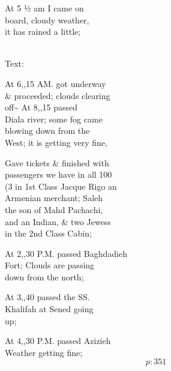 \documentclass{report}
\begin{document}

	\par{
 	At 5 ½ am I came on\ \\board, cloudy weather,\ \\it has rained a little;\ \\\ \\
	}

	\par{
 	Text:\ \\
	}

	\par{
 	At 6,,15 AM. got underway\ \\\& proceeded; clouds clearing\ \\off\~{} At 8,,15 passed\ \\Diala river; some fog came\ \\blowing down from the\ \\West; it is getting very fine,\ \\
	}

	\par{
 	Gave tickets \& finished with\ \\passengers we have in all 100\ \\(3 in 1st Class Jacque Rigo an\ \\Armenian merchant; Saleh\ \\the son of Mahd Pachachi,\ \\and an Indian, \& two Jewess\ \\in the 2nd Class Cabin;\ \\
	}

	\par{
 	At 2,,30 P.M. passed Baghdadieh\ \\Fort; Clouds are passing\ \\down from the north;\ \\
	}

	\par{
 	At 3,,40 passed the SS.\ \\Khalifah at Sened going\ \\up;\ \\
	}

	\par{
 	At 4,,30 P.M. passed Azizieh\ \\Weather getting fine;\ \\
  \[p: 351 \]

	}

\end{document}
